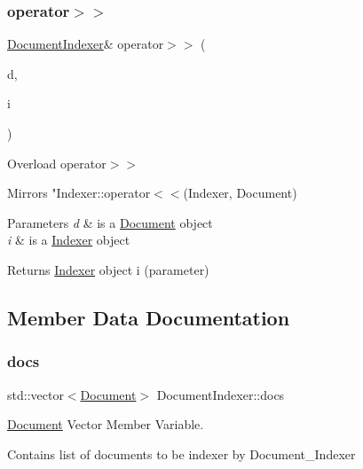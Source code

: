 \subsubsection{\texorpdfstring{operator$>$$>$}{operator>>}}
{\footnotesize\ttfamily \hyperlink{class_document_indexer}{Document\+Indexer}\& operator$>$$>$ (\begin{DoxyParamCaption}\item[{const \hyperlink{class_document}{Document} \&}]{d,  }\item[{\hyperlink{class_document_indexer}{Document\+Indexer} \&}]{i }\end{DoxyParamCaption})\hspace{0.3cm}{\ttfamily [friend]}}



Overload operator$>$$>$ 

Mirrors "Indexer\+::operator$<$$<$(\+Indexer, Document)


\begin{DoxyParams}{Parameters}
{\em d} & is a \hyperlink{class_document}{Document} object \\
\hline
{\em i} & is a \hyperlink{class_indexer}{Indexer} object \\
\hline
\end{DoxyParams}
\begin{DoxyReturn}{Returns}
\hyperlink{class_indexer}{Indexer} object i (parameter) 
\end{DoxyReturn}


\subsection{Member Data Documentation}
\mbox{\label{class_document_indexer_ae16293674b0d10d0a859232e65dba989}} 
\subsubsection{\texorpdfstring{docs}{docs}}
{\footnotesize\ttfamily std\+::vector$<$\hyperlink{class_document}{Document}$>$ Document\+Indexer\+::docs\hspace{0.3cm}{\ttfamily [private]}}



\hyperlink{class_document}{Document} Vector Member Variable. 

Contains list of documents to be indexer by Document\+\_\+\+Indexer \mbox{\label{class_document_indexer_a1a03f236f4ed59ee96f47e0c0f1d53be}} 
